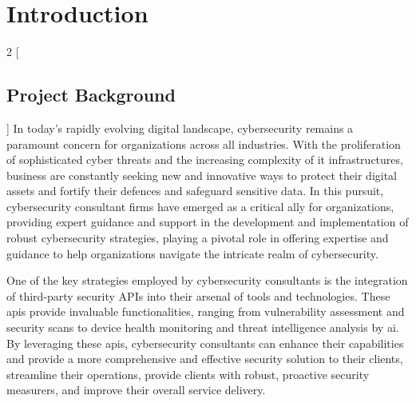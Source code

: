 \chapter{Introduction}
\begin{multicols}{2}
      [\section{Project Background}]
      In today's rapidly evolving digital landscape, cybersecurity remains a paramount concern for organizations
      across all industries. With the proliferation of sophisticated cyber threats and the increasing complexity of
      \acrshort{it} infrastructures, business are constantly seeking new and innovative ways to protect their
      digital assets and fortify their defences and safeguard sensitive data. In this pursuit, cybersecurity
      consultant firms have emerged as a critical ally for organizations, providing expert guidance and support in
      the development and implementation of robust cybersecurity strategies, playing a pivotal role in offering
      expertise and guidance to help organizations navigate the intricate realm of cybersecurity.

      One of the key strategies employed by cybersecurity consultants is the integration of third-party security
      \gls{API}s into their arsenal of tools and technologies. These \acrshort{api}s provide invaluable
      functionalities, ranging from vulnerability assessment and security scans to device health monitoring and
      threat intelligence analysis by \acrshort{ai}. By leveraging these \acrshort{api}s, cybersecurity consultants
      can enhance their capabilities and provide a more comprehensive and effective security solution to their
      clients, streamline their operations, provide clients with robust, proactive security measurers, and improve
      their overall service delivery.


\end{multicols}
